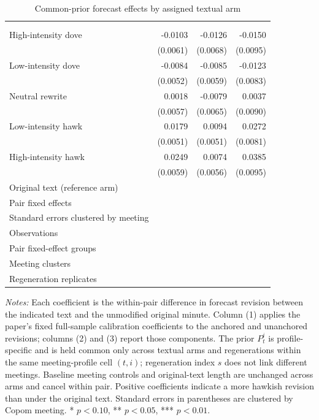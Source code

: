 \begin{table}[htbp]
\color{revisionred}
\centering
\begin{threeparttable}
\caption{Common-prior forecast effects by assigned textual arm}
\label{tab:common-prior-dose-arms}
\begin{footnotesize}
\begin{tabular}{lddd}
\toprule
 &  &  &  \\
 &  &  &  \\
\midrule
High-intensity dove & -0.0103\sym{*} & -0.0126\sym{*} & -0.0150 \\
 & (0.0061) & (0.0068) & (0.0095) \\
Low-intensity dove & -0.0084 & -0.0085 & -0.0123 \\
 & (0.0052) & (0.0059) & (0.0083) \\
Neutral rewrite & 0.0018 & -0.0079 & 0.0037 \\
 & (0.0057) & (0.0065) & (0.0090) \\
Low-intensity hawk & 0.0179\sym{***} & 0.0094\sym{*} & 0.0272\sym{***} \\
 & (0.0051) & (0.0051) & (0.0081) \\
High-intensity hawk & 0.0249\sym{***} & 0.0074 & 0.0385\sym{***} \\
 & (0.0059) & (0.0056) & (0.0095) \\
\midrule
Original text (reference arm) &  &  &  \\
Pair fixed effects &  &  &  \\
Standard errors clustered by meeting &  &  &  \\
Observations &  &  &  \\
Pair fixed-effect groups &  &  &  \\
Meeting clusters &  &  &  \\
Regeneration replicates &  &  &  \\
\bottomrule
\end{tabular}
\begin{tablenotes}[flushleft]
\scriptsize
\item \textit{Notes:} Each coefficient is the within-pair difference in forecast revision between the indicated text and the unmodified original minute. Column (1) applies the paper's fixed full-sample calibration coefficients to the anchored and unanchored revisions; columns (2) and (3) report those components. The prior $P_t^i$ is profile-specific and is held common only across textual arms and regenerations within the same meeting-profile cell $(t,i)$; regeneration index $s$ does not link different meetings. Baseline meeting controls and original-text length are unchanged across arms and cancel within pair. Positive coefficients indicate a more hawkish revision than under the original text. Standard errors in parentheses are clustered by Copom meeting. * $p<0.10$, ** $p<0.05$, *** $p<0.01$.
\end{tablenotes}
\end{footnotesize}
\end{threeparttable}
\end{table}
